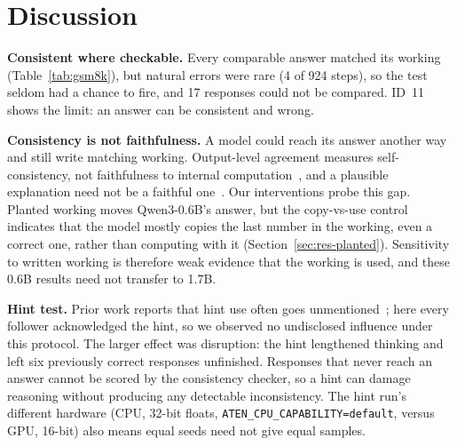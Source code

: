 \section{Discussion}\label{sec:discussion}
\textbf{Consistent where checkable.} Every comparable answer matched its working
(Table~\ref{tab:gsm8k}), but natural errors were rare (4 of 924 steps), so the test
seldom had a chance to fire, and 17 responses could not be compared. ID~11 shows the
limit: an answer can be consistent and wrong.

\textbf{Consistency is not faithfulness.} A model could reach its answer another way
and still write matching working. Output-level agreement measures self-consistency, not
faithfulness to internal computation~\cite{parcalabescu2024}, and a plausible
explanation need not be a faithful one~\cite{jacovi2020}. Our interventions probe this
gap. Planted working moves Qwen3-0.6B's answer, but the copy-vs-use control indicates
that the model mostly copies the last number in the working, even a correct one, rather
than computing with it (Section~\ref{sec:res-planted}). Sensitivity to written working
is therefore weak evidence that the working is used, and these 0.6B results need not
transfer to 1.7B.

\textbf{Hint test.} Prior work reports that hint use often goes
unmentioned~\cite{turpin2023,chen2025}; here every follower acknowledged the hint, so we
observed no undisclosed influence under this protocol. The larger effect was
disruption: the hint lengthened thinking and left six previously correct responses
unfinished. Responses that never reach an answer cannot be scored by the consistency
checker, so a hint can damage reasoning without producing any detectable
inconsistency. The hint run's different hardware (CPU, 32-bit floats,
\texttt{ATEN\_CPU\_CAPABILITY=default}, versus GPU, 16-bit) also means equal seeds need
not give equal samples.

